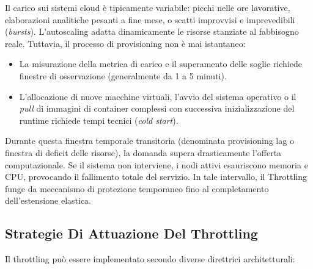 \documentclass[11pt, a4paper]{article}
\begin{document}
Il carico sui sistemi cloud è tipicamente variabile: picchi nelle ore lavorative, elaborazioni analitiche pesanti a fine mese, o scatti improvvisi e imprevedibili (\emph{bursts}). L'autoscaling adatta dinamicamente le risorse stanziate al fabbisogno reale. Tuttavia, il processo di provisioning non è mai istantaneo:
\begin{itemize}[noitemsep]
    \item La misurazione della metrica di carico e il superamento delle soglie richiede finestre di osservazione (generalmente da 1 a 5 minuti).
    \item L'allocazione di nuove macchine virtuali, l'avvio del sistema operativo o il \emph{pull} di immagini di container complessi con successiva inizializzazione del runtime richiede tempi tecnici (\emph{cold start}).
\end{itemize}
Durante questa finestra temporale transitoria (denominata provisioning lag o finestra di deficit delle risorse), la domanda supera drasticamente l'offerta computazionale. Se il sistema non interviene, i nodi attivi esauriscono memoria e CPU, provocando il fallimento totale del servizio. In tale intervallo, il Throttling funge da meccanismo di protezione temporaneo fino al completamento dell'estensione elastica.

\subsection{Strategie Di Attuazione Del Throttling}

Il throttling può essere implementato secondo diverse direttrici architetturali:
\end{document}
